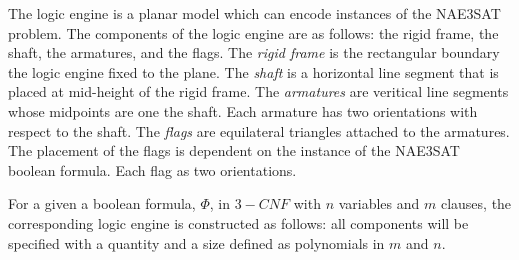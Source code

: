 The logic engine is a planar model which can encode instances of the NAE3SAT problem.  The 
components of the logic engine are as follows: the rigid frame, the shaft, the armatures,
 and the flags.  
The \textit{rigid frame} is the rectangular boundary the logic engine fixed to the plane.  The 
\textit{shaft} is a horizontal line segment that is placed at mid-height of the rigid frame.  The 
\textit{armatures} are veritical line segments whose midpoints are one the shaft.  Each armature 
has two orientations with respect to the shaft.  The \textit{flags} are equilateral triangles 
attached to the armatures.  The placement of the flags is dependent on the instance of the NAE3SAT 
boolean formula. Each flag as two orientations.

For a given a boolean formula, $\Phi$, in $3-CNF$ with $n$ variables and $m$ clauses, the 
corresponding logic engine is constructed as follows: all components will be specified with a 
quantity and a size defined as polynomials in $m$ and $n$.

